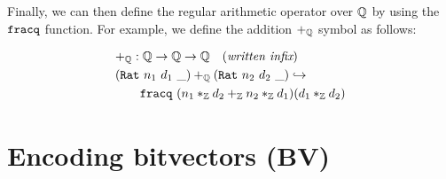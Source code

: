 Finally, we can then define the regular arithmetic operator over $\mathbb{Q}$ by using the $\texttt{\upshape{fracq}}$ function.
For example, we define the addition $+_{\mathbb{Q}}$ symbol as follows:

\begin{align*}
&+_{\mathbb{Q}} : \mathbb{Q} \rightarrow \mathbb{Q} \rightarrow \mathbb{Q} \quad (\textit{written infix})\\ 
&(\texttt{\upshape{Rat}}~n_1~d_1~\_) +_{\mathbb{Q}} (\texttt{\upshape{Rat}}~n_2~d_2~\_) \hookrightarrow\\
&\qquad \texttt{\upshape{fracq}}~(n_1 *_{\mathbb{Z}} d_2 +_{\mathbb{Z}} n_2 *_{\mathbb{Z}} d_1) (d_1 *_{\mathbb{Z}} d_2) \\
\end{align*}


\section{Encoding bitvectors (\textbf{BV})}
\label{ssec:encoding-bv}

